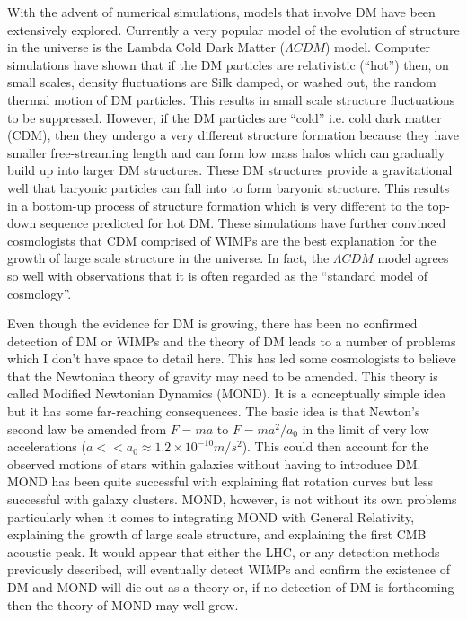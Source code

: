 \documentclass[a4paper,12pt]{article}
\begin{document}
With the advent of numerical simulations, models that involve DM have been extensively explored. Currently a very popular model of the evolution of structure in the universe is
the Lambda Cold Dark Matter ($\Lambda CDM$) model. Computer simulations have shown that if the DM particles are relativistic (``hot'') then, on small scales, density fluctuations are Silk damped, or
washed out, the random thermal motion of DM particles. This results in small scale structure fluctuations to be suppressed. However, if the DM particles are ``cold'' i.e. cold dark matter (CDM), then
they undergo a very different structure formation because they have smaller free-streaming length and can form low mass halos which can gradually build up into larger DM
structures. These DM structures provide a gravitational well that baryonic particles can fall into to form baryonic structure. This results in a bottom-up process of structure 
formation which is very different to the top-down sequence predicted for hot DM. These simulations have further convinced cosmologists that CDM comprised of WIMPs are the best
explanation for the growth of large scale structure in the universe. In fact, the $\Lambda CDM$ model agrees so well with observations that it is often regarded as the ``standard model
of cosmology''.

Even though the evidence for DM is growing, there has been no confirmed detection of DM or WIMPs and the theory of DM leads to a number of problems \citep{sellwood} which I don't
have space to detail here. This has led some cosmologists to believe that the Newtonian theory of gravity may need to be amended. This theory is called Modified Newtonian
Dynamics (MOND). It is a conceptually simple idea but it has some far-reaching consequences. The basic idea is that Newton's second law be amended from $F=ma$ to $F=ma^2/a_0$ in the
limit of very low accelerations ($a<<a_0\approx 1.2\times10^{-10}m/s^2$). This could then account for the observed motions of stars within galaxies without having to introduce
DM. MOND has been quite successful with explaining flat rotation curves but less successful with galaxy clusters. MOND, however, is not without its own problems particularly when it
comes to integrating MOND with General Relativity, explaining the growth of large scale structure, and explaining the first CMB acoustic peak.
It would appear that either the LHC, or any detection methods previously described, will eventually detect WIMPs and confirm the existence of DM and MOND will die out as a theory or, if
no detection of DM is forthcoming then the theory of MOND may well grow.
\end{document}
